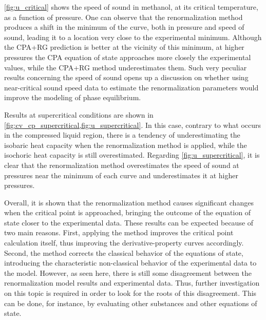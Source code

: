 \documentclass[preprint,12pt,3p]{elsarticle}
\begin{document}
\cref{fig:u_critical} shows the speed of sound in methanol, at its critical temperature, as a function of pressure.
One can observe that the renormalization method produces a shift in the minimum of the curve, both in pressure and speed of sound, leading it to a location very close to the experimental minimum.
Although the CPA+RG prediction is better at the vicinity of this minimum, at higher pressures the CPA equation of state approaches more closely the experimental values, while the CPA+RG method underestimates them.
Such very peculiar results concerning the speed of sound opens up a discussion on whether using  near-critical sound speed data to estimate the renormalization parameters would improve the modeling of phase equilibrium.

Results at supercritical conditions are shown in \cref{fig:cv_cp_supercritical,fig:u_supercritical}.
In this case, contrary to what occurs in the compressed liquid region, there is a tendency of underestimating the isobaric heat capacity when the renormalization method is applied, while the isochoric heat capacity is still overestimated.
Regarding \cref{fig:u_supercritical}, it is clear that the renormalization method overestimates the speed of sound at pressures near the minimum of each curve and underestimates it at higher pressures.

Overall, it is shown that the renormalization method causes significant changes when the critical point is approached, 
bringing the outcome of the equation of state closer to the experimental data.
These results can be expected because of two main reasons.
First, applying the method improves the critical point calculation itself, thus improving the derivative-property curves accordingly.
Second, the method corrects the classical behavior of the equations of state, introducing the characteristic non-classical behavior of the experimental data to the model.
However, as seen here, there is still some disagreement between the renormalization model results and experimental data.
Thus, further investigation on this topic is required in order to look for the roots of this disagreement.
This can be done, for instance, by evaluating other substances and other equations of state.
\end{document}
